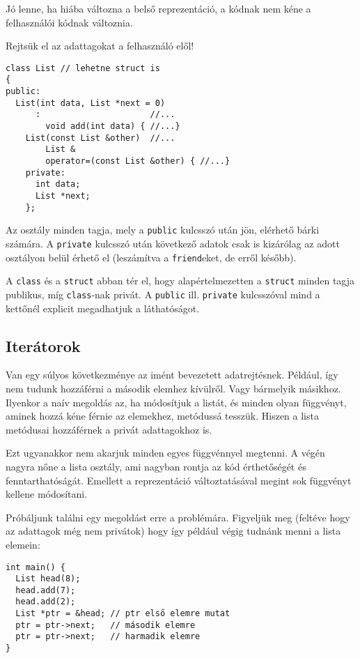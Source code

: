 \documentclass[../cpp_book/cpp_book.tex]{subfiles}
\begin{document}
	Jó lenne, ha hiába változna a belső reprezentáció, a kódnak nem kéne a felhasználói kódnak változnia. 
	
	Rejtsük el az adattagokat a felhasználó elől!

\begin{lstlisting}
class List // lehetne struct is
{
public:
  List(int data, List *next = 0)
      :                      //...
        void add(int data) { //...}
    List(const List &other)  //...
        List &
        operator=(const List &other) { //...}
    private:
      int data;
      List *next;
    };
\end{lstlisting}
  Az osztály minden tagja, mely a \texttt{public} kulcsszó után jön, elérhető bárki számára. A \texttt{private} kulcsszó után következő adatok csak is kizárólag az adott osztályon belül érhető el (leszámítva a \texttt{friend}eket, de erről később).

	A \texttt{class} és a \texttt{struct} abban tér el, hogy alapértelmezetten a \texttt{struct} minden tagja publikus, míg \texttt{class}-nak privát. A \texttt{public} ill. \texttt{private} kulcsszóval mind a kettőnél explicit megadhatjuk a láthatóságot.
	\subsection{Iterátorok}
	Van egy súlyos következménye az imént bevezetett adatrejtésnek. Például, így nem tudunk hozzáférni a második elemhez kívülről. Vagy bármelyik másikhoz. Ilyenkor a naív megoldás az, ha módosítjuk a listát, és minden olyan függvényt, aminek hozzá kéne férnie az elemekhez, metódussá tesszük. Hiszen a lista metódusai hozzáférnek a privát adattagokhoz is.
	
	Ezt ugyanakkor nem akarjuk minden egyes függvénnyel megtenni. A végén nagyra nőne a lista osztály, ami nagyban rontja az kód érthetőségét és fenntarthatóságát. Emellett a reprezentáció változtatásával megint sok függvényt kellene módosítani.
	
	\medskip
	Próbáljunk találni egy megoldást erre a problémára. Figyeljük meg (feltéve hogy az adattagok még nem privátok) hogy így például végig tudnánk menni a lista elemein:
	\begin{lstlisting}
int main() {
  List head(8);
  head.add(7);
  head.add(2);
  List *ptr = &head; // ptr első elemre mutat
  ptr = ptr->next;   // második elemre
  ptr = ptr->next;   // harmadik elemre
}
	\end{lstlisting}
	
\end{document}
